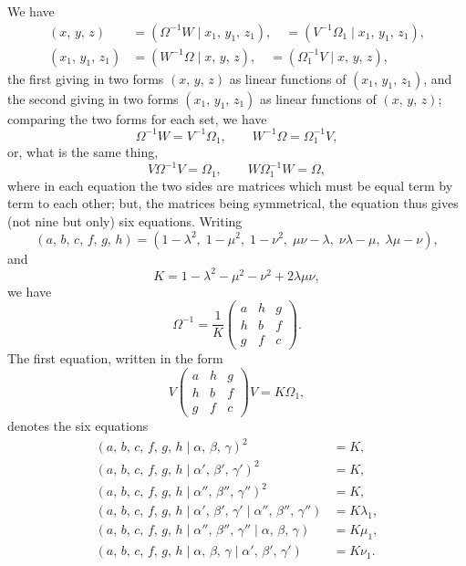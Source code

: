 \documentclass[11pt]{article}
\begin{document}
We have
\begin{align*}
   (x,\, y,\, z)       &= (\Omega^{-1} W \mid x_1,\, y_1,\, z_1), \quad = (V^{-1} \Omega_1 \mid x_1,\, y_1,\, z_1),\\
   (x_1,\, y_1,\, z_1) &= (W^{-1} \Omega \mid x,\, y,\, z),       \quad = (\Omega_1^{-1} V \mid x,\, y,\, z),
\end{align*}
the first giving in two forms $(x,\, y,\, z)$ as linear functions of $(x_1,\, y_1,\, z_1)$, and the
second giving in two forms $(x_1,\, y_1,\, z_1)$ as linear functions of $(x,\, y,\, z)$; comparing
the two forms for each set, we have
\[
   \Omega^{-1} W = V^{-1} \Omega_1,\qquad W^{-1} \Omega = \Omega_1^{-1} V,
\]
or, what is the same thing,
\[
   V \Omega^{-1} V = \Omega_1,\qquad W \Omega_1^{-1} W = \Omega,
\]
where in each equation the two sides are matrices which must be equal term by
term to each other; but, the matrices being symmetrical, the equation thus gives (not
nine but only) six equations. Writing
\[
   (a,\, b,\, c,\, f,\, g,\, h) = (1 - \lambda^2,\; 1 - \mu^2,\; 1 - \nu^2,\; \mu\nu - \lambda,\; \nu\lambda - \mu,\; \lambda\mu - \nu),
\]
and
\[
   K = 1 - \lambda^2 - \mu^2 - \nu^2 + 2\lambda\mu\nu,
\]
we have
\[
   \Omega^{-1} = \frac{1}{K}\begin{pmatrix} a & h & g \\ h & b & f \\ g & f & c \end{pmatrix}.
\]
The first equation, written in the form
\[
   V\!\begin{pmatrix} a & h & g \\ h & b & f \\ g & f & c \end{pmatrix}\!V = K\Omega_1,
\]
denotes the six equations
\begin{align*}
   (a,\, b,\, c,\, f,\, g,\, h \mid \alpha,\, \beta,\, \gamma)^2 &= K,\\
   (a,\, b,\, c,\, f,\, g,\, h \mid \alpha',\, \beta',\, \gamma')^2 &= K,\\
   (a,\, b,\, c,\, f,\, g,\, h \mid \alpha'',\, \beta'',\, \gamma'')^2 &= K,\\
   (a,\, b,\, c,\, f,\, g,\, h \mid \alpha',\, \beta',\, \gamma' \mid \alpha'',\, \beta'',\, \gamma'') &= K\lambda_1,\\
   (a,\, b,\, c,\, f,\, g,\, h \mid \alpha'',\, \beta'',\, \gamma'' \mid \alpha,\, \beta,\, \gamma) &= K\mu_1,\\
   (a,\, b,\, c,\, f,\, g,\, h \mid \alpha,\, \beta,\, \gamma \mid \alpha',\, \beta',\, \gamma') &= K\nu_1.
\end{align*}
\end{document}
